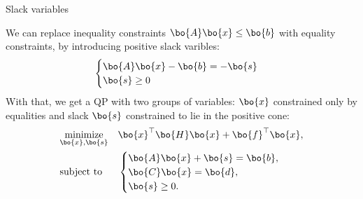 \documentclass{beamer}
\begin{document}
\begin{frame}{Slack variables}
	\begin{flushleft}
		
		We can replace inequality constraints $\bo{A}\bo{x} \leq \bo{b}$ with equality constraints, by introducing positive slack varibles:
		\begin{align}
			\begin{cases}
				\bo{A}\bo{x} - \bo{b} =  -\bo{s} \\
				\bo{s} \geq 0
			\end{cases}
		\end{align}
		With that, we get a QP with two groups of variables: $\bo{x}$ constrained only by equalities and slack $\bo{s}$ constrained to lie in the positive cone:
		\begin{equation}
			\begin{aligned}
				& \underset{\bo{x}, \bo{s}}{\text{minimize}}
				& & \bo{x}^\top \bo{H} \bo{x} + \bo{f}^\top\bo{x}, \\
				& \text{subject to}
				& & \begin{cases}
					\bo{A}\bo{x} + \bo{s}  =  \bo{b}, \\
					\bo{C}\bo{x} = \bo{d},\\
					\bo{s} \geq 0.
				\end{cases}
			\end{aligned}
		\end{equation}
		
		
	\end{flushleft}
\end{frame}
\end{document}
